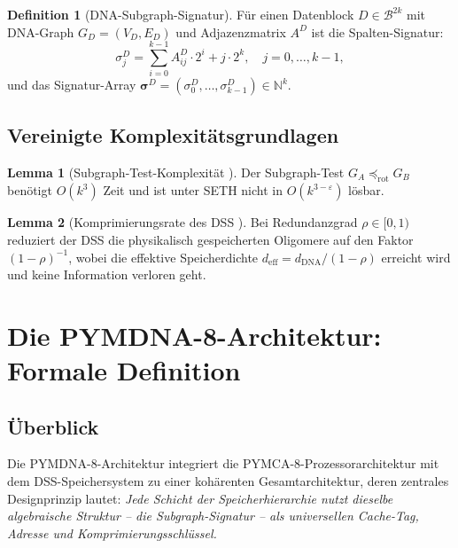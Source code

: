 ﻿\documentclass[a4paper,12pt]{article}
\theoremstyle{definition}
\newtheorem{definition}{Definition}[section]
\newtheorem{lemma}{Lemma}[section]
\begin{document}
\begin{definition}[DNA-Subgraph-Signatur]
  \label{def:signatur}
  Für einen Datenblock $D \in \mathcal{B}^{2k}$ mit DNA-Graph
  $G_D = (V_D, E_D)$ und Adjazenzmatrix $A^D$ ist die Spalten-Signatur:
  \[
    \sigma_j^D = \sum_{i=0}^{k-1} A^D_{ij} \cdot 2^i + j \cdot 2^k,
    \quad j = 0,\ldots,k-1,
  \]
  und das Signatur-Array $\boldsymbol{\sigma}^D = (\sigma_0^D,\ldots,\sigma_{k-1}^D) \in \mathbb{N}^k$.
\end{definition}

\subsection{Vereinigte Komplexitätsgrundlagen}

\begin{lemma}[Subgraph-Test-Komplexität \cite{epp2026subgraph}]
  \label{lem:subgraph_complexity}
  Der Subgraph-Test $G_A \preceq_{\mathrm{rot}} G_B$ benötigt $O(k^3)$ Zeit
  und ist unter SETH nicht in $O(k^{3-\varepsilon})$ lösbar.
\end{lemma}

\begin{lemma}[Komprimierungsrate des DSS \cite{epp2026dnastor}]
  \label{lem:komprimierung}
  Bei Redundanzgrad $\rho \in [0,1)$ reduziert der DSS die physikalisch
  gespeicherten Oligomere auf den Faktor $(1-\rho)^{-1}$, wobei die
  effektive Speicherdichte $d_{\mathrm{eff}} = d_{\mathrm{DNA}} / (1-\rho)$
  erreicht wird und keine Information verloren geht.
\end{lemma}

\section{Die PYMDNA-8-Architektur: Formale Definition}

\subsection{Überblick}

Die PYMDNA-8-Architektur integriert die PYMCA-8-Prozessorarchitektur
\cite{epp2026pymca8} mit dem DSS-Speichersystem \cite{epp2026dnastor}
zu einer kohärenten Gesamtarchitektur, deren zentrales Designprinzip
lautet: \emph{Jede Schicht der Speicherhierarchie nutzt dieselbe
algebraische Struktur -- die Subgraph-Signatur -- als universellen
Cache-Tag, Adresse und Komprimierungsschlüssel.}
\end{document}
